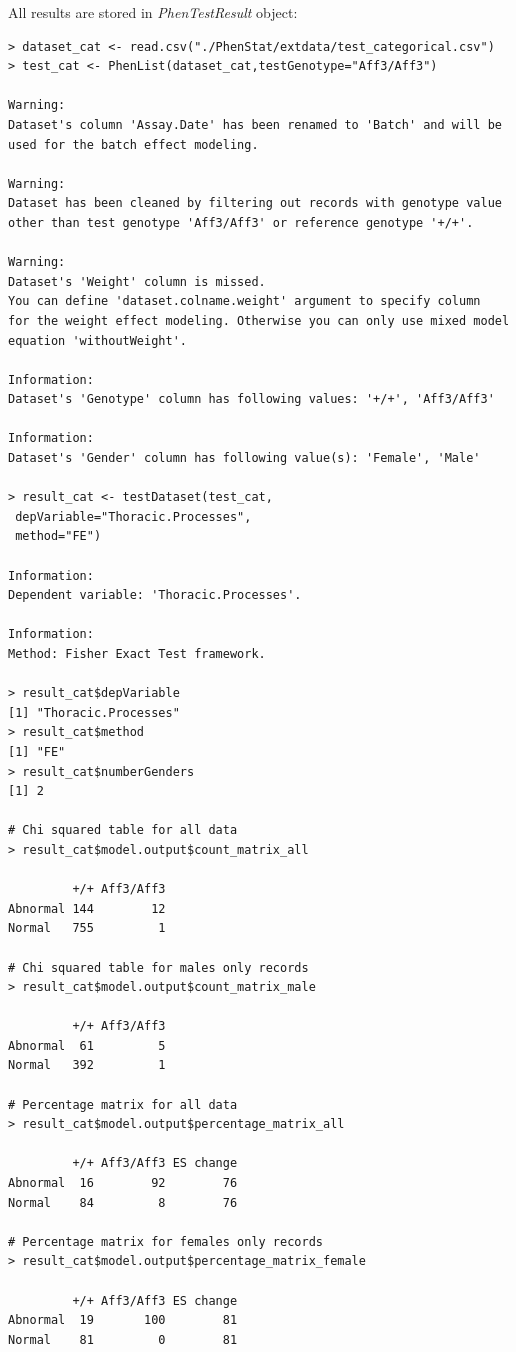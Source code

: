 \documentclass[12pt,a4paper]{article}
\begin{document}
All results are stored in \textit{PhenTestResult} object:

\begingroup
    \fontsize{8pt}{12pt}\selectfont
\begin{verbatim}
> dataset_cat <- read.csv("./PhenStat/extdata/test_categorical.csv")
> test_cat <- PhenList(dataset_cat,testGenotype="Aff3/Aff3")
 
Warning:
Dataset's column 'Assay.Date' has been renamed to 'Batch' and will be used for the batch effect modeling.

Warning:
Dataset has been cleaned by filtering out records with genotype value 
other than test genotype 'Aff3/Aff3' or reference genotype '+/+'.

Warning:
Dataset's 'Weight' column is missed.
You can define 'dataset.colname.weight' argument to specify column 
for the weight effect modeling. Otherwise you can only use mixed model equation 'withoutWeight'.

Information:
Dataset's 'Genotype' column has following values: '+/+', 'Aff3/Aff3'

Information:
Dataset's 'Gender' column has following value(s): 'Female', 'Male'

> result_cat <- testDataset(test_cat,
 depVariable="Thoracic.Processes",
 method="FE")

Information:
Dependent variable: 'Thoracic.Processes'.

Information:
Method: Fisher Exact Test framework.

> result_cat$depVariable
[1] "Thoracic.Processes"
> result_cat$method
[1] "FE"
> result_cat$numberGenders
[1] 2

# Chi squared table for all data
> result_cat$model.output$count_matrix_all

         +/+ Aff3/Aff3
Abnormal 144        12
Normal   755         1

# Chi squared table for males only records
> result_cat$model.output$count_matrix_male

         +/+ Aff3/Aff3
Abnormal  61         5
Normal   392         1

# Percentage matrix for all data
> result_cat$model.output$percentage_matrix_all

         +/+ Aff3/Aff3 ES change
Abnormal  16        92        76
Normal    84         8        76

# Percentage matrix for females only records
> result_cat$model.output$percentage_matrix_female

         +/+ Aff3/Aff3 ES change
Abnormal  19       100        81
Normal    81         0        81


\end{verbatim}
\end{document}
